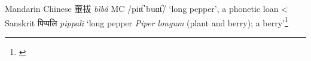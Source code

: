 \begin{etymology}\label{ety:biba}
Mandarin Chinese {蓽拔} \textit{bìbá} \gls{MC} /piɪt̚  buɑt̚/ `long pepper', a phonetic loan
< Sanskrit {पिप्पलि } \textit{pippali} `long pepper \textit{Piper longum} (plant and berry); a berry'\footnote{\textcite[626]{monier-williams_sanskrit-english_1899}}
\end{etymology}